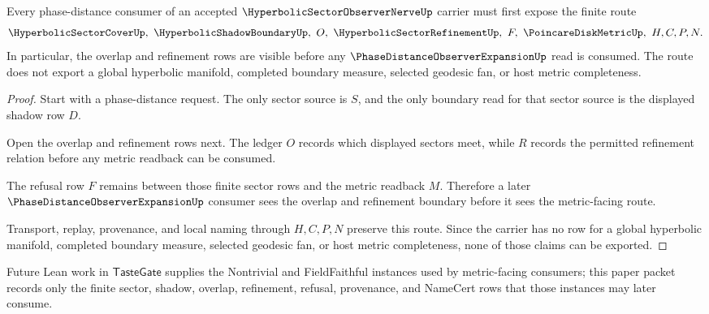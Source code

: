 \begin{theorem}
\label{thm:hyperbolic-sector-observer-nerve-phase-distance-route}
Every phase-distance consumer of an accepted $\HyperbolicSectorObserverNerveUp$ carrier must first expose the finite route
$$
\HyperbolicSectorCoverUp,\ \HyperbolicShadowBoundaryUp,\ O,\ \HyperbolicSectorRefinementUp,\ F,\ \PoincareDiskMetricUp,\ H,C,P,N.
$$
In particular, the overlap and refinement rows are visible before any $\PhaseDistanceObserverExpansionUp$ read is consumed. The route does not export a global hyperbolic manifold, completed boundary measure, selected geodesic fan, or host metric completeness.
\end{theorem}
\begin{proof}
Start with a phase-distance request. The only sector source is $S$, and the only boundary read for that sector source is the displayed shadow row $D$.

Open the overlap and refinement rows next. The ledger $O$ records which displayed sectors meet, while $R$ records the permitted refinement relation before any metric readback can be consumed.

The refusal row $F$ remains between those finite sector rows and the metric readback $M$. Therefore a later $\PhaseDistanceObserverExpansionUp$ consumer sees the overlap and refinement boundary before it sees the metric-facing route.

Transport, replay, provenance, and local naming through $H,C,P,N$ preserve this route. Since the carrier has no row for a global hyperbolic manifold, completed boundary measure, selected geodesic fan, or host metric completeness, none of those claims can be exported.
\end{proof}



Future Lean work in $\mathsf{TasteGate}$ supplies the Nontrivial and FieldFaithful instances used by metric-facing consumers; this paper packet records only the finite sector, shadow, overlap, refinement, refusal, provenance, and NameCert rows that those instances may later consume.

